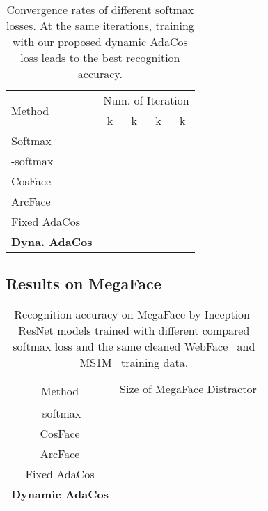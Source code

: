 \documentclass[10pt,twocolumn,letterpaper]{article}
\begin{document}
\begin{table}
\begin{center}
\begin{tabular}{|l|c|c|c|c|}
\hline
\multirow{2}{*}{Method} & \multicolumn{4}{c|}{Num. of Iteration}\\
\cline{2-5}& k & k & k& k \\
\hline\hline
Softmax                        &  & & & \\
-softmax~\cite{L2-softmax} &  & & & \\
CosFace~\cite{CosFace}         &  & & & \\
ArcFace~\cite{ArcFace}         &  & & & \\
\hline
Fixed AdaCos                 &  & & & \\
\bf{Dyna. AdaCos}                &  & & & \\
\hline
\end{tabular}
\end{center}
\caption{ Convergence rates of different softmax losses. At the same iterations, training with our proposed dynamic AdaCos loss leads to the best recognition accuracy.}
\label{tab:lfw_speed}

\end{table}





\subsection{Results on MegaFace}

\begin{table*}
\begin{center}
\begin{tabular}{|c||c|c|c|c|c|c|}

\hline
    \multirow{2}{*}{Method} & \multicolumn{6}{c|}{Size of MegaFace Distractor} \\
\cline{2-7}&&&&&&\\
    \hline  \hline
  -softmax&  &  &  &  &  & \\
    CosFace&  &  &  &  &  & \\  
    ArcFace   &  &  &  &  &  & \\
    \hline
 Fixed AdaCos&  &  &  &  &  & \\
    {\bf Dynamic AdaCos} &  &  &  &  &  &  \\
    
\hline

\end{tabular}
\end{center}
\caption{ Recognition accuracy on MegaFace by Inception-ResNet \cite{szegedy2017inception} models trained with different compared softmax loss and the same cleaned WebFace~\cite{WebFace} and MS1M~\cite{MS-Celeb-1M} training data.}
\label{tab:megaface_benchmark}
\end{table*}
\end{document}
